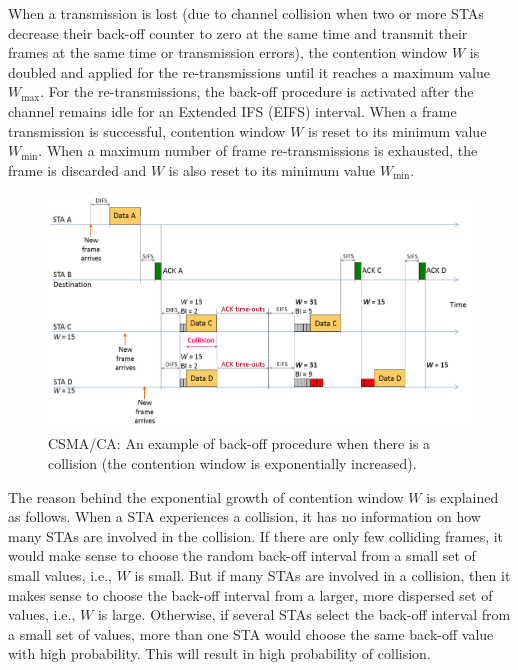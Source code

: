 When a transmission is lost (due to channel collision when two or more STAs decrease their back-off counter to zero at the same time and transmit their frames at the same time or transmission errors), the contention window $W$ is doubled and applied for the re-transmissions until it reaches a maximum value $W_{\max}$. For the re-transmissions, the back-off procedure is activated after the channel remains idle for an Extended IFS (EIFS) interval. When a frame transmission is successful, contention window $W$ is reset to its minimum value $W_{\min}$. When a maximum number of frame re-transmissions is exhausted, the frame is discarded and $W$ is also reset to its minimum value $W_{\min}$.

\begin{figure}[!t]
	\centering
	\includegraphics[width=1.0\columnwidth]{figs/CSMA-CA-back-off-with-collision}
	\caption{CSMA/CA: An example of back-off procedure when there is a collision (the contention window is exponentially increased).}
	\label{figs:CSMA-CA-back-off-with-collision}
\end{figure}

The reason behind the exponential growth of contention window $W$ is explained as follows. When a STA experiences a collision, it has no information on how many STAs are involved in the collision. If there are only few colliding frames, it would make sense to choose the random back-off interval from a small set of small values, i.e., $W$ is small. But if many STAs are involved in a collision, then it makes sense to choose the back-off interval from a larger, more dispersed set of values, i.e., $W$ is large. Otherwise, if several STAs select the back-off interval from a small set of values, more than one STA would choose the same back-off value with high probability. This will result in high probability of collision.

